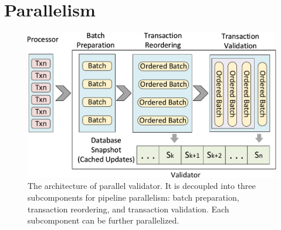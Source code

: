 

\section{Parallelism}
\label{sec:parallel}
\label{sec:validator_reordering:parallel}

\begin{figure}[t]
	\centering
	\includegraphics[width=.9\columnwidth]{./figures/validator}
	\caption{The architecture of parallel validator. It is decoupled into three subcomponents for pipeline parallelism: batch preparation, transaction reordering, and transaction validation. Each subcomponent can be further parallelized.}
	\label{fig:reorder:validator}
\end{figure}

